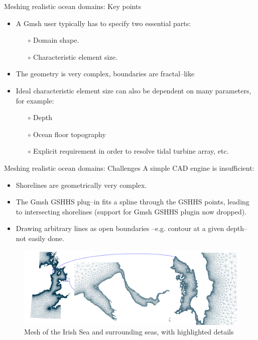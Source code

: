 \documentclass[t]{beamer}
\begin{document}
\begin{frame}{Meshing realistic ocean domains: Key points}
\begin{itemize}
   \item A Gmsh user typically has to specify two essential parts:
   \begin{itemize}
      \item[$\circ$] Domain shape.
      \item[$\circ$] Characteristic element size.
   \end{itemize}\vspace{20pt}
   \item The geometry is very complex, boundaries are fractal--like
   \item Ideal characteristic element size can also be dependent on many parameters, for example:
   \begin{itemize}
       \item[$\circ$] Depth
       \item[$\circ$] Ocean floor topography
       \item[$\circ$] Explicit requirement in order to resolve tidal turbine array, etc.
   \end{itemize}
\end{itemize}
\end{frame}

\begin{frame}{Meshing realistic ocean domains: Challenges}
A simple CAD engine is insufficient:
\begin{itemize}
   \item Shorelines are geometrically very complex.
   \item The Gmsh GSHHS plug--in fits a spline through the GSHHS points, leading to intersecting shorelines (support for Gmsh GSHHS plugin now dropped).
   \item Drawing arbitrary lines as open boundaries --e.g. contour at a given depth-- not easily done.
\end{itemize}
\begin{figure}[htbp]
 \centering
  \includegraphics[width=1.00\textwidth]{figures/UKwc_mesh_with_details/UK_west_coast_with_details}
  \caption{Mesh of the Irish Sea and surrounding seas, with highlighted details}
  \label{fig:IrishSeaMesh}
\end{figure}
\end{frame}
\end{document}
